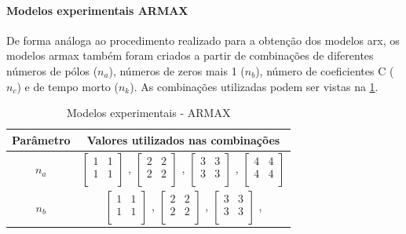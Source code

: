 \paragraph*{\textbf{Modelos experimentais ARMAX}}
\label{par:modelos_experimentais_armax}

De forma análoga ao procedimento realizado para a obtenção dos modelos \acrshort{arx}, os modelos
\acrshort{armax} também foram criados a partir de combinações de diferentes números de pólos ($n_a$),
números de zeros mais 1 ($n_b$), número de coeficientes C ($n_c$) e de tempo morto ($n_k$).
As combinações utilizadas podem ser vistas na \cref{tab:tclabsp-models-armax}.

\begin{table}[h]
	\centering
	\caption{Modelos experimentais - ARMAX}
	\label{tab:tclabsp-models-armax}
	\begin{tabular}{c|c} \toprule
		{Parâmetro}		&	{Valores utilizados nas combinações}									\\ \midrule
		$n_a$			&
							$ \begin{bmatrix}	1	&	1	\\	1	&	1	\\	\end{bmatrix} $	,		
							$ \begin{bmatrix}	2	&	2	\\	2	&	2	\\	\end{bmatrix} $	,		
							$ \begin{bmatrix}	3	&	3	\\	3	&	3	\\	\end{bmatrix} $	,		
							$ \begin{bmatrix}	4	&	4	\\	4	&	4	\\	\end{bmatrix} $		\\ \midrule
		$n_b$			&
							$ \begin{bmatrix}	1	&	1	\\	1	&	1	\\	\end{bmatrix} $	,		
							$ \begin{bmatrix}	2	&	2	\\	2	&	2	\\	\end{bmatrix} $	,		
							$ \begin{bmatrix}	3	&	3	\\	3	&	3	\\	\end{bmatrix} $	,		

\end{tabular}
\end{table}
